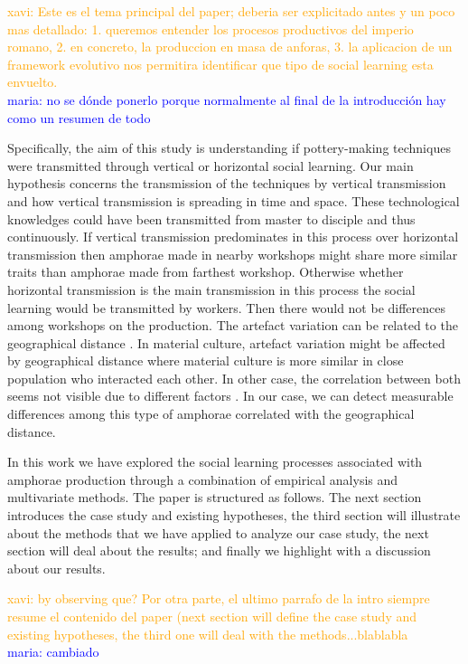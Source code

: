 \documentclass[review]{elsarticle}
\newcommand{\memo}[2]{\textcolor{#1}{#2}}
\newcommand{\xavi}[1]{\memo{orange}{xavi: #1\\}}
\newcommand{\maria}[1]{\memo{blue}{maria: #1\\}}
\begin{document}
\xavi{Este es el tema principal del paper; deberia ser explicitado antes y un poco mas detallado: 1. queremos entender los procesos productivos del imperio romano, 2. en concreto, la produccion en masa de anforas, 3. la aplicacion de un framework evolutivo nos permitira identificar que tipo de social learning esta envuelto.}
\maria{no se dónde ponerlo porque normalmente al final de la introducción hay como un resumen de todo}
 

Specifically, the aim of this study is understanding if pottery-making techniques were transmitted through vertical or horizontal social learning. Our main hypothesis concerns the transmission of the techniques by vertical transmission and how vertical transmission is spreading in time and space. These technological knowledges could have been transmitted from master to disciple and thus continuously. If vertical transmission predominates in this process over horizontal transmission then amphorae made in nearby workshops might share more similar traits than amphorae made from farthest workshop. Otherwise whether horizontal transmission is the main transmission in this process the social learning would be transmitted by workers. Then there would not be differences among workshops on the production. The artefact variation can be related to the geographical distance \citep{bjorklund_effect_2010,shennan_isolation-by-distance_2015, van_strien_isolation-by-distance_2015}. In material culture, artefact variation might be affected by geographical distance where material culture is more similar in close population who interacted each other. In other case, the correlation between both seems not visible due to different factors \citep{hart_effects_2012}. In our case, we can detect measurable differences among this type of amphorae correlated with the geographical distance.

In this work we have explored the social learning processes associated with amphorae production through a combination of empirical analysis and multivariate methods. The paper is structured as follows. The next section introduces the case study and existing hypotheses, the third section will illustrate about the methods that we have applied to analyze our case study, the next section will deal about the results; and finally we highlight with a discussion about our results.  

\xavi{by observing que? Por otra parte, el ultimo parrafo de la intro siempre resume el contenido del paper (next section will define the case study and existing hypotheses, the third one will deal with the methods...blablabla}
\maria{cambiado}
\end{document}
